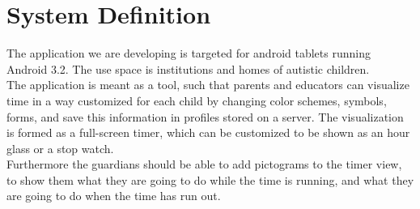 \section{System Definition}
The application we are developing is targeted for android tablets running Android 3.2. The use space is institutions and homes of autistic children.\\
   The application is meant as a tool, such that parents and educators can visualize time in a way customized for each child by changing color schemes, symbols, forms, and save this information in profiles stored on a server. The visualization is formed as a full-screen timer, which can be customized to be shown as an hour glass or a stop watch.\\
   Furthermore the guardians should be able to add pictograms to the timer view, to show them what they are going to do while the time is running, and what they are going to do when the time has run out.
   
\begin{comment}   
  In addition, the timer application should be used to control the allowed time spent on other applications, such as games. When the launcher is in autist mode, the timer application should be opened as an overlay whenever another application is opened. This overlay shows how much time is left, and when the time is up, it will lock the given application with a customized cooldown. Also the timer application should include a timelock, such that other applications are only available in specific time spans.
\end{comment}